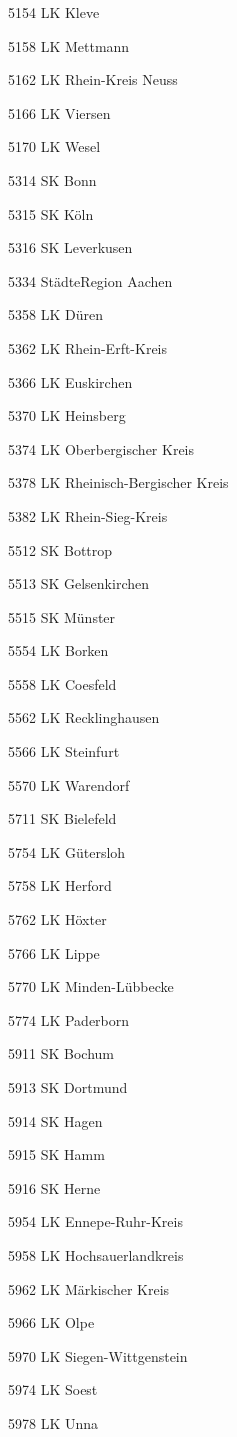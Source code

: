 5154  LK Kleve

5158  LK Mettmann

5162  LK Rhein-Kreis Neuss

5166  LK Viersen

5170  LK Wesel

5314  SK Bonn

5315  SK Köln

5316  SK Leverkusen

5334  StädteRegion Aachen

5358  LK Düren

5362  LK Rhein-Erft-Kreis

5366  LK Euskirchen

5370  LK Heinsberg

5374  LK Oberbergischer Kreis

5378  LK Rheinisch-Bergischer Kreis

5382  LK Rhein-Sieg-Kreis

5512  SK Bottrop

5513  SK Gelsenkirchen

5515  SK Münster

5554  LK Borken

5558  LK Coesfeld

5562  LK Recklinghausen

5566  LK Steinfurt

5570  LK Warendorf

5711  SK Bielefeld

5754  LK Gütersloh

5758  LK Herford

5762  LK Höxter

5766  LK Lippe

5770  LK Minden-Lübbecke

5774  LK Paderborn

5911  SK Bochum

5913  SK Dortmund

5914  SK Hagen

5915  SK Hamm

5916  SK Herne

5954  LK Ennepe-Ruhr-Kreis

5958  LK Hochsauerlandkreis

5962  LK Märkischer Kreis

5966  LK Olpe

5970  LK Siegen-Wittgenstein

5974  LK Soest

5978  LK Unna

